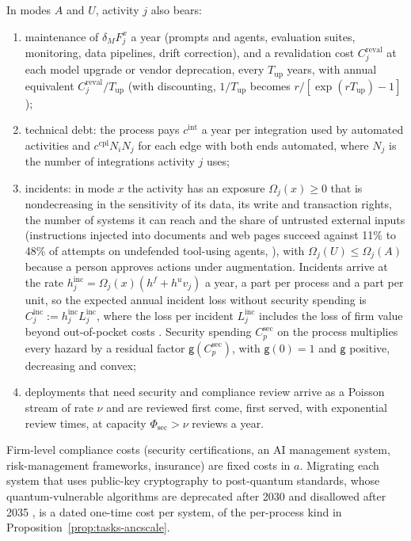 \begin{assumption}\label{ass:tasks-ancillary}
In modes $A$ and $U$, activity $j$ also bears:
\begin{enumerate}
\item[(i)] maintenance of $\delta_MF^x_j$ a year (prompts and agents, evaluation suites, monitoring, data pipelines, drift correction), and a revalidation cost $C^{\mathrm{reval}}_j$ at each model upgrade or vendor deprecation, every $T_{\mathrm{up}}$ years, with annual equivalent $C^{\mathrm{reval}}_j/T_{\mathrm{up}}$ (with discounting, $1/T_{\mathrm{up}}$ becomes $r/[\exp(rT_{\mathrm{up}})-1]$);
\item[(ii)] technical debt: the process pays $c^{\mathrm{int}}$ a year per integration used by automated activities and $c^{\mathrm{cpl}}N_iN_j$ for each edge with both ends automated, where $N_j$ is the number of integrations activity $j$ uses;
\item[(iii)] incidents: in mode $x$ the activity has an exposure $\Omega_j(x)\ge 0$ that is nondecreasing in the sensitivity of its data, its write and transaction rights, the number of systems it can reach and the share of untrusted external inputs (instructions injected into documents and web pages succeed against 11\% to 48\% of attempts on undefended tool-using agents, \citealp{greshake2023not,debenedetti2024agentdojo}), with $\Omega_j(U)\le\Omega_j(A)$ because a person approves actions under augmentation. Incidents arrive at the rate $h^{\mathrm{inc}}_j=\Omega_j(x)(h^f+h^uv_j)$ a year, a part per process and a part per unit, so the expected annual incident loss without security spending is $C^{\mathrm{inc}}_j:=h^{\mathrm{inc}}_jL^{\mathrm{inc}}_j$, where the loss per incident $L^{\mathrm{inc}}_j$ includes the loss of firm value beyond out-of-pocket costs \citep{kamiya2021risk,florackis2023cybersecurity}. Security spending $C^{\mathrm{sec}}_p$ on the process multiplies every hazard by a residual factor $\mathsf g(C^{\mathrm{sec}}_p)$, with $\mathsf g(0)=1$ and $\mathsf g$ positive, decreasing and convex;
\item[(iv)] deployments that need security and compliance review arrive as a Poisson stream of rate $\nu$ and are reviewed first come, first served, with exponential review times, at capacity $\Phi_{\mathrm{sec}}>\nu$ reviews a year.
\end{enumerate}
Firm-level compliance costs (security certifications, an AI management system, risk-management frameworks, insurance) are fixed costs in $a$. Migrating each system that uses public-key cryptography to post-quantum standards, whose quantum-vulnerable algorithms are deprecated after 2030 and disallowed after 2035 \citep{moody2026transition}, is a dated one-time cost per system, of the per-process kind in Proposition~\ref{prop:tasks-ancscale}.
\end{assumption}

